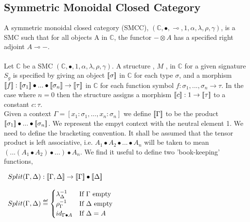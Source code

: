 \subsection{Symmetric Monoidal Closed Category}
\label{subsec:symmetric_monoidal_closded_category}
\begin{definition}
    A symmetric monoidal closed category (SMCC), $(\mathbb{C},\bullet,\multimap,1,\alpha,\lambda,\rho,\gamma)$,
    is a SMC such that for all objects A in $\mathbb{C}$, the functor $-\otimes A$ has a specified right adjoint $A\multimap -$.
    \\
    \\
    \indent Let $\mathbb{C}$ be a SMC $(\mathbb{C},\bullet,1,\alpha,\lambda,\rho,\gamma)$. A structure , $M$ , in $\mathbb{C}$ for a given signature 
    $S_g$ is specified by giving an object $[\negthinspace[\sigma]\negthinspace]$ in $\mathbb{C}$ for each type $\sigma$, and a morphism 
    $\interp{f}:\interp{\sigma_1}\bullet...\bullet \interp{\sigma_n} \rightarrow \interp{\tau}$ in $\mathbb{C}$ for each function symbol
    $f:\sigma_1 , ... , \sigma_n \rightarrow \tau$.  In the case where $n = 0$ then the structure assigns a morphism 
    $[\negthinspace[c]\negthinspace]:1 \rightarrow [\negthinspace[\tau]\negthinspace]$ to a constant $c:\tau$.
    \\
    \indent Given a context $\Gamma = [x_1:\sigma_1,...,x_n:\sigma_n]$ we define $[\negthinspace[\Gamma]\negthinspace]$ to be the product
    $[\negthinspace[\sigma_1]\negthinspace]\bullet ... \bullet [\negthinspace[\sigma_n]\negthinspace]$.  We represent the empyt context with the neutral element 1.  We need
    to define the bracketing convention.  It shall be assumed that the tensor product is left associative, i.e. $A_1 \bullet A_2\bullet ... \bullet A_n$ 
    will be taken to mean $(...(A_1 \bullet A_2)\bullet...)\bullet A_n$.  We find it useful to define two 'book-keeping' functions,
    \begin{center}
        \begin{math}
            \begin{array}{l}
                Split(\Gamma,\Delta):\interp{\Gamma,\Delta} \rightarrow \interp{\Gamma} \bullet \interp{\Delta}\\\\
                Split(\Gamma,\Delta) \myeq
                \begin{cases}
                    \lambda^{-1}_{\Delta} & \text{If }\Gamma \text{ empty}\\
                    \rho^{-1}_{\Gamma} & \text{If } \Delta \text{ empty}\\
                    id_{\Gamma \bullet A} & \text{If } \Delta = A\\

\end{cases}
\end{array}
\end{math}
\end{center}
\end{definition}
